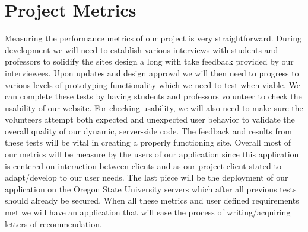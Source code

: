 \documentclass[onecolumn, draftclsnofoot,10pt, compsoc]{IEEEtran}
\begin{document}
\section{Project Metrics}
\flushleft
Measuring the performance metrics of our project is very straightforward. During development we will need to establish various interviews with students and professors to solidify the sites design a long with take feedback provided by our interviewees. Upon updates and design approval we will then need to progress to various levels of prototyping functionality which we need to test when viable. We can complete these tests by having students and professors volunteer to check the usability of our website. For checking usability, we will also need to make sure the volunteers attempt both expected and unexpected user behavior to validate the overall quality of our dynamic, server-side code. The feedback and results from these tests will be vital in creating a properly functioning site. Overall most of our metrics will be measure by the users of our application since this application is centered on interaction between clients and as our project client stated to adapt/develop to our user needs. The last piece will be the deployment of our application on the Oregon State University servers which after all previous tests should already be secured. When all these metrics and user defined requirements met we will have an application that will ease the process of writing/acquiring letters of recommendation. 
\end{document}
